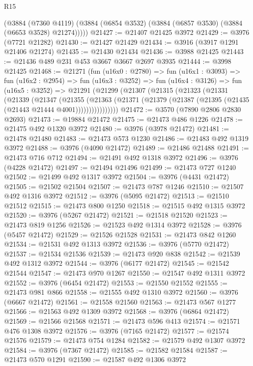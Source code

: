 \begin{lexlean}{R15}
\begin{coremodule}
      (@3884
        (@7360 @4119)
        (@3884 (@6854 @3532) (@3884 (@6857 @3530) (@3884 (@6653 @3528) @21274)))))
@21427 := @21407 @21425 @3972
@21429 := @3976 (@7721 @21282)
@21430 := @21427 @21429
@21434 := @3916 (@3917 @1291 @21406 @21274)
@21435 := @21430 @21434
@21436 := @3988 @21425
@21443 := @21436 @489 @231 @453 @3667 @3667 @2697 @3935
@21444 := @3998 @21425
@21468 := @21271
    (fun (u16x0 : @2780) =>
    fun (u16x1 : @3093) =>
    fun (u16x2 : @2954) =>
    fun (u16x3 : @3252) =>
    fun (u16x4 : @3126) =>
    fun (u16x5 : @3252) =>
    @21291
      (@21299
        (@21307
          (@21315
            (@21323
              (@21331
                (@21339
                  (@21347
                    (@21355
                      (@21363
                        (@21371 (@21379 (@21387 (@21395 (@21435 (@21443 @21444 @4001))))))))))))))))
@21472 := @3570 (@7890 @2806 @2830 @2693)
@21473 := @19884 @21472
@21475 := @21473 @486 @1226
@21478 := @21475 @492 @1320 @3972
@21480 := @3976 (@3978 @21472)
@21481 := @21478 @21480
@21483 := @21473 @573 @1230
@21486 := @21483 @492 @1319 @3972
@21488 := @3976 (@4090 @21472)
@21489 := @21486 @21488
@21491 := @21473 @716 @712
@21494 := @21491 @492 @1318 @3972
@21496 := @3976 (@4228 @21472)
@21497 := @21494 @21496
@21499 := @21473 @727 @1240
@21502 := @21499 @492 @1317 @3972
@21504 := @3976 (@4431 @21472)
@21505 := @21502 @21504
@21507 := @21473 @787 @1246
@21510 := @21507 @492 @1316 @3972
@21512 := @3976 (@5095 @21472)
@21513 := @21510 @21512
@21515 := @21473 @800 @1250
@21518 := @21515 @492 @1315 @3972
@21520 := @3976 (@5267 @21472)
@21521 := @21518 @21520
@21523 := @21473 @819 @1256
@21526 := @21523 @492 @1314 @3972
@21528 := @3976 (@5457 @21472)
@21529 := @21526 @21528
@21531 := @21473 @842 @1260
@21534 := @21531 @492 @1313 @3972
@21536 := @3976 (@5770 @21472)
@21537 := @21534 @21536
@21539 := @21473 @920 @838
@21542 := @21539 @492 @1312 @3972
@21544 := @3976 (@6177 @21472)
@21545 := @21542 @21544
@21547 := @21473 @970 @1267
@21550 := @21547 @492 @1311 @3972
@21552 := @3976 (@6454 @21472)
@21553 := @21550 @21552
@21555 := @21473 @981 @866
@21558 := @21555 @492 @1310 @3972
@21560 := @3976 (@6667 @21472)
@21561 := @21558 @21560
@21563 := @21473 @567 @1277
@21566 := @21563 @492 @1309 @3972
@21568 := @3976 (@6864 @21472)
@21569 := @21566 @21568
@21571 := @21473 @596 @413
@21574 := @21571 @476 @1308 @3972
@21576 := @3976 (@7165 @21472)
@21577 := @21574 @21576
@21579 := @21473 @754 @1284
@21582 := @21579 @492 @1307 @3972
@21584 := @3976 (@7367 @21472)
@21585 := @21582 @21584
@21587 := @21473 @570 @1291
@21590 := @21587 @492 @1306 @3972

\end{coremodule}
\end{lexlean}
